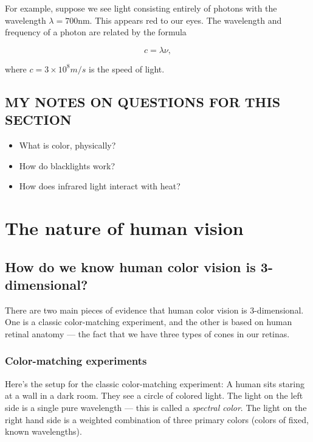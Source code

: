 \documentclass[
]{article}
\providecommand{\tightlist}{%
  \setlength{\itemsep}{0pt}\setlength{\parskip}{0pt}}
\begin{document}
For example, suppose we see light consisting entirely of photons with
the wavelength \(\lambda = 700\)nm. This appears red to our eyes. The
wavelength and frequency of a photon are related by the formula

\[ c = \lambda \nu,\]

where \(c = 3\times 10^8 m/s\) is the speed of light.

\hypertarget{my-notes-on-questions-for-this-section}{%
\subsection{MY NOTES ON QUESTIONS FOR THIS
SECTION}\label{my-notes-on-questions-for-this-section}}

\begin{itemize}
\tightlist
\item
  What is color, physically?
\item
  How do blacklights work?
\item
  How does infrared light interact with heat?
\end{itemize}

\hypertarget{the-nature-of-human-vision}{%
\section{The nature of human vision}\label{the-nature-of-human-vision}}

\hypertarget{how-do-we-know-human-color-vision-is-3-dimensional}{%
\subsection{How do we know human color vision is
3-dimensional?}\label{how-do-we-know-human-color-vision-is-3-dimensional}}

There are two main pieces of evidence that human color vision is
3-dimensional. One is a classic color-matching experiment, and the other
is based on human retinal anatomy --- the fact that we have three types
of cones in our retinas.

\hypertarget{color-matching-experiments}{%
\subsubsection{Color-matching
experiments}\label{color-matching-experiments}}

Here's the setup for the classic color-matching experiment: A human sits
staring at a wall in a dark room. They see a circle of colored light.
The light on the left side is a single pure wavelength --- this is
called a \emph{spectral color}. The light on the right hand side is a
weighted combination of three primary colors (colors of fixed, known
wavelengths).
\end{document}
